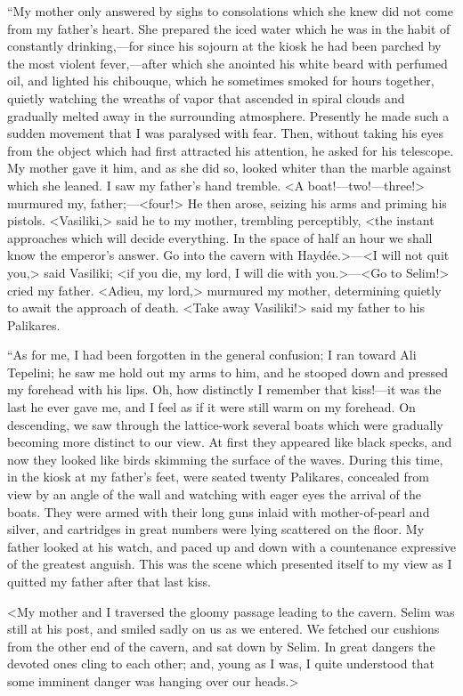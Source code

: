  “My mother only answered by sighs to consolations which she knew did not come from my father's heart. She prepared the iced water which he was in the habit of constantly drinking,—for since his sojourn at the kiosk he had been parched by the most violent fever,—after which she anointed his white beard with perfumed oil, and lighted his chibouque, which he sometimes smoked for hours together, quietly watching the wreaths of vapor that ascended in spiral clouds and gradually melted away in the surrounding atmosphere. Presently he made such a sudden movement that I was paralysed with fear. Then, without taking his eyes from the object which had first attracted his attention, he asked for his telescope. My mother gave it him, and as she did so, looked whiter than the marble against which she leaned. I saw my father's hand tremble. <A boat!—two!—three!> murmured my, father;—<four!> He then arose, seizing his arms and priming his pistols. <Vasiliki,> said he to my mother, trembling perceptibly, <the instant approaches which will decide everything. In the space of half an hour we shall know the emperor's answer. Go into the cavern with Haydée.>—<I will not quit you,> said Vasiliki; <if you die, my lord, I will die with you.>—<Go to Selim!> cried my father. <Adieu, my lord,> murmured my mother, determining quietly to await the approach of death. <Take away Vasiliki!> said my father to his Palikares. 

 “As for me, I had been forgotten in the general confusion; I ran toward Ali Tepelini; he saw me hold out my arms to him, and he stooped down and pressed my forehead with his lips. Oh, how distinctly I remember that kiss!—it was the last he ever gave me, and I feel as if it were still warm on my forehead. On descending, we saw through the lattice-work several boats which were gradually becoming more distinct to our view. At first they appeared like black specks, and now they looked like birds skimming the surface of the waves. During this time, in the kiosk at my father's feet, were seated twenty Palikares, concealed from view by an angle of the wall and watching with eager eyes the arrival of the boats. They were armed with their long guns inlaid with mother-of-pearl and silver, and cartridges in great numbers were lying scattered on the floor. My father looked at his watch, and paced up and down with a countenance expressive of the greatest anguish. This was the scene which presented itself to my view as I quitted my father after that last kiss. 

 <My mother and I traversed the gloomy passage leading to the cavern. Selim was still at his post, and smiled sadly on us as we entered. We fetched our cushions from the other end of the cavern, and sat down by Selim. In great dangers the devoted ones cling to each other; and, young as I was, I quite understood that some imminent danger was hanging over our heads.> 

